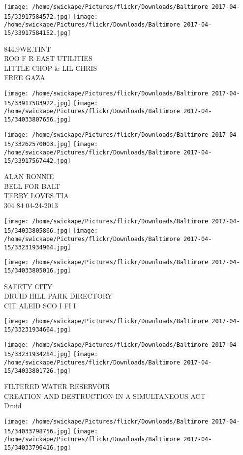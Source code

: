 \documentclass[10pt,letterpaper]{article}
\begin{document}
\texttt{[image: /home/swickape/Pictures/flickr/Downloads/Baltimore 2017-04-15/33917584572.jpg]}
\texttt{[image: /home/swickape/Pictures/flickr/Downloads/Baltimore 2017-04-15/33917584152.jpg]}

844.9WE.TINT\\
ROO F R EAST UTILITIES\\
LITTLE CHOP \& LIL CHRIS\\
FREE GAZA
\pagebreak

\texttt{[image: /home/swickape/Pictures/flickr/Downloads/Baltimore 2017-04-15/33917583922.jpg]}
\texttt{[image: /home/swickape/Pictures/flickr/Downloads/Baltimore 2017-04-15/34033807656.jpg]}

\texttt{[image: /home/swickape/Pictures/flickr/Downloads/Baltimore 2017-04-15/33262570003.jpg]}
\texttt{[image: /home/swickape/Pictures/flickr/Downloads/Baltimore 2017-04-15/33917567442.jpg]}

ALAN RONNIE\\
BELL FOR BALT\\
TERRY LOVES TIA\\
304 84 04{-}24{-}2013
\pagebreak

\texttt{[image: /home/swickape/Pictures/flickr/Downloads/Baltimore 2017-04-15/34033805866.jpg]}
\texttt{[image: /home/swickape/Pictures/flickr/Downloads/Baltimore 2017-04-15/33231934964.jpg]}

\texttt{[image: /home/swickape/Pictures/flickr/Downloads/Baltimore 2017-04-15/34033805016.jpg]}

SAFETY CITY\\
DRUID HILL PARK DIRECTORY\\
CIT ALEID SCO I FI I
\pagebreak

\texttt{[image: /home/swickape/Pictures/flickr/Downloads/Baltimore 2017-04-15/33231934664.jpg]}

\vspace{0.25in}
\texttt{[image: /home/swickape/Pictures/flickr/Downloads/Baltimore 2017-04-15/33231934284.jpg]}
\texttt{[image: /home/swickape/Pictures/flickr/Downloads/Baltimore 2017-04-15/34033801726.jpg]}

FILTERED WATER RESERVOIR\\
CREATION AND DESTRUCTION IN A SIMULTANEOUS ACT\\
Druid
\pagebreak

\texttt{[image: /home/swickape/Pictures/flickr/Downloads/Baltimore 2017-04-15/34033798756.jpg]}
\texttt{[image: /home/swickape/Pictures/flickr/Downloads/Baltimore 2017-04-15/34033796416.jpg]}
\end{document}
